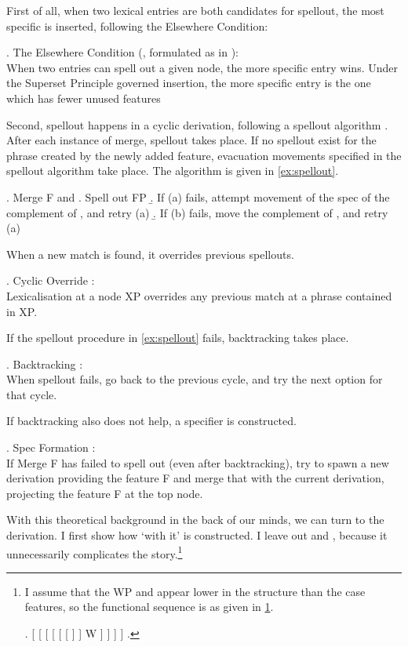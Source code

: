 \documentclass[12pt]{article}
\begin{document}
First of all, when two lexical entries are both candidates for spellout, the most specific is inserted, following the Elsewhere Condition:

\ex. The Elsewhere Condition (\citealt{kiparsky1973}, formulated as in \citealt{caha2020}):\\
When two entries can spell out a given node, the more specific entry wins. Under the Superset Principle governed insertion, the more specific entry is the one which has fewer unused features

Second, spellout happens in a cyclic derivation, following a spellout algorithm \citep{starke2018}. After each instance of merge, spellout takes place. If no spellout exist for the phrase created by the newly added feature, evacuation movements specified in the spellout algorithm take place. The algorithm is given in \ref{ex:spellout}.

\ex. Merge F and \label{ex:spellout}
 \a. Spell out FP
 \b. If (a) fails, attempt movement of the spec of the complement of , and retry (a)
 \b. If (b) fails, move the complement of , and retry (a)

When a new match is found, it overrides previous spellouts.

\ex. Cyclic Override \citep{starke2018}:\\
Lexicalisation at a node XP overrides any previous match at a phrase contained in XP.

If the spellout procedure in \ref{ex:spellout} fails, backtracking takes place.

\ex. Backtracking \citep{starke2018}:\\
When spellout fails, go back to the previous cycle, and try the next option for that cycle.

If backtracking also does not help, a specifier is constructed.

\ex. Spec Formation \citep{starke2018}:\\
If Merge F has failed to spell out (even after backtracking), try to spawn a new derivation providing the feature F and merge that with the current derivation, projecting the feature F at the top node.

With this theoretical background in the back of our minds, we can turn to the derivation. I first show how  `with it' is constructed. I leave out  and , because it unnecessarily complicates the story.\footnote{I assume that the WP and  appear lower in the structure than the case features, so the functional sequence is as given in \ref{ex:fseq}.

\ex. [ [ [ [ [ [  ]  ] W ]  ]  ]   ]\label{ex:fseq}
\z.

\phantom{x}

}
\end{document}
